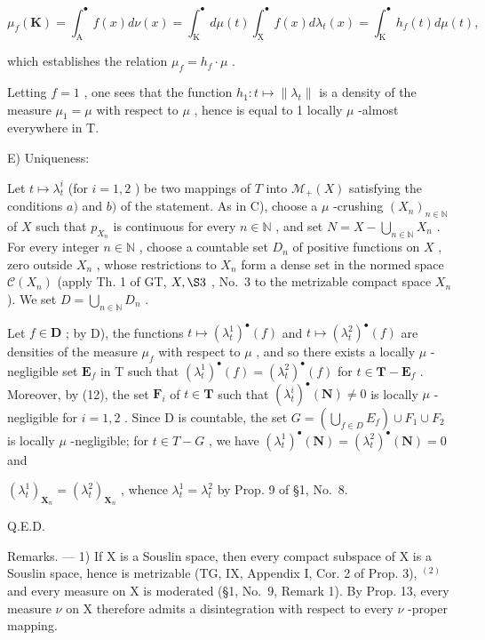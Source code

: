 \[
\mu_ {f} (\mathbf {K}) = \int_ {\mathrm{A}} ^ {\bullet} f (x) d \nu (x) = \int_ {\mathrm{K}} ^ {\bullet} d \mu (t) \int_ {\mathrm{X}} ^ {\bullet} f (x) d \lambda_ {t} (x) = \int_ {\mathrm{K}} ^ {\bullet} h _ {f} (t) d \mu (t),
\]

which establishes the relation \(\mu_f = h_f \cdot \mu\) .

Letting \(f = 1\) , one sees that the function \(h_1: t \mapsto \| \lambda_t \|\) is a density of the measure \(\mu_1 = \mu\) with respect to \(\mu\) , hence is equal to 1 locally \(\mu\) -almost everywhere in T.

E) Uniqueness:

Let \(t \mapsto \lambda_t^i\) (for \(i = 1,2\) ) be two mappings of \(T\) into \(\mathcal{M}_+(X)\) satisfying the conditions \(a)\) and \(b)\) of the statement. As in C), choose a \(\mu\) -crushing \((X_n)_{n \in \mathbb{N}}\) of \(X\) such that \(p_{X_n}\) is continuous for every \(n \in \mathbb{N}\) , and set \(N = X - \bigcup_{n \in \mathbb{N}} X_n\) . For every integer \(n \in \mathbb{N}\) , choose a countable set \(D_n\) of positive functions on \(X\) , zero outside \(X_n\) , whose restrictions to \(X_n\) form a dense set in the normed space \(\mathcal{C}(X_n)\) (apply Th. 1 of GT, \(X, \S 3\) , No.~3 to the metrizable compact space \(X_n\) ). We set \(D = \bigcup_{n \in \mathbb{N}} D_n\) .

Let \(f \in \mathbf{D}\) ; by D), the functions \(t \mapsto (\lambda_t^1)^{\bullet}(f)\) and \(t \mapsto (\lambda_t^2)^{\bullet}(f)\) are densities of the measure \(\mu_f\) with respect to \(\mu\) , and so there exists a locally \(\mu\) -negligible set \(\mathbf{E}_f\) in T such that \((\lambda_t^1)^{\bullet}(f) = (\lambda_t^2)^{\bullet}(f)\) for \(t \in \mathbf{T} - \mathbf{E}_f\) . Moreover, by (12), the set \(\mathbf{F}_i\) of \(t \in \mathbf{T}\) such that \((\lambda_t^i)^{\bullet}(\mathbf{N}) \neq 0\) is locally \(\mu\) -negligible for \(i = 1, 2\) . Since D is countable, the set \(G = \left( \bigcup_{f \in D} E_f \right) \cup F_1 \cup F_2\) is locally \(\mu\) -negligible; for \(t \in T - G\) , we have \((\lambda_t^1)^{\bullet}(\mathbf{N}) = (\lambda_t^2)^{\bullet}(\mathbf{N}) = 0\) and

\((\lambda_t^1)_{\mathbf{X}_n} = (\lambda_t^2)_{\mathbf{X}_n}\) , whence \(\lambda_t^1 = \lambda_t^2\) by Prop. 9 of §1, No.~8.

Q.E.D.

Remarks. --- 1) If X is a Souslin space, then every compact subspace of X is a Souslin space, hence is metrizable (TG, IX, Appendix I, Cor. 2 of Prop. 3), \(^{(2)}\) and every measure on X is moderated (§1, No.~9, Remark 1). By Prop. 13, every measure \(\nu\) on X therefore admits a disintegration with respect to every \(\nu\) -proper mapping.

